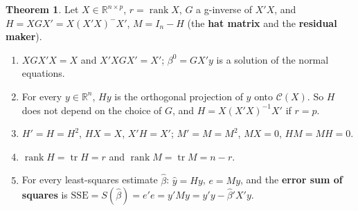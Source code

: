 \documentclass[12pt]{article}
\newcommand{\R}{\mathbb R}
\DeclareMathOperator{\tr}{tr}
\DeclareMathOperator{\rank}{rank}
\theoremstyle{definition}
\newtheorem{theorem}{Theorem}
\begin{document}
\begin{theorem}\label{h-thm-hat}
Let \(X\in\R^{n\times p}\), \(r=\rank X\), \(G\) a g-inverse of \(X'X\), and \(H=XGX'=X(X'X)^-X'\), \(M=I_n-H\) (the
\textbf{hat matrix} and the \textbf{residual maker}).
\begin{enumerate}
\item \(XGX'X=X\) and \(X'XGX'=X'\); \(\beta^0=GX'y\) is a solution of the normal equations.
\item For every \(y\in\R^n\), \(Hy\) is the orthogonal projection of \(y\) onto \(\mathcal C(X)\). So \(H\) does not depend
on the choice of \(G\), and \(H=X(X'X)^{-1}X'\) if \(r=p\).
\item \(H'=H=H^2\), \(HX=X\), \(X'H=X'\); \(M'=M=M^2\), \(MX=0\), \(HM=MH=0\).
\item \(\rank H=\tr H=r\) and \(\rank M=\tr M=n-r\).
\item For every least-squares estimate \(\hat\beta\): \(\hat y=Hy\), \(e=My\), and the \textbf{error sum of squares} is
\(\mathrm{SSE}=S(\hat\beta)=e'e=y'My=y'y-\hat\beta'X'y\).
\end{enumerate}
\end{theorem}
\end{document}
